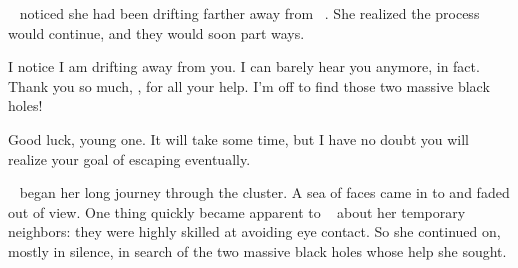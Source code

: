 \documentclass[main.tex]{subfiles}
\begin{document}
\par \nar \rmsterope~ noticed she had been drifting farther away from \rmenrico~.  She realized the process would continue, and they would soon part ways.

\par \Sterope I notice I am drifting away from you.  I can barely hear you anymore, in fact.  Thank you so much, \rmenrico, for all your help.  I'm off to find those two massive black holes!

\par \Enrico Good luck, young one.  It will take some time, but I have no doubt you will realize your goal of escaping eventually.

\par \nar \rmsterope~ began her long journey through the cluster.  A sea of faces came in to and faded out of view.  One thing quickly became apparent to \rmsterope~ about her temporary neighbors:  they were highly skilled at avoiding eye contact.  So she continued on, mostly in silence, in search of the two massive black holes whose help she sought.
\end{document}
